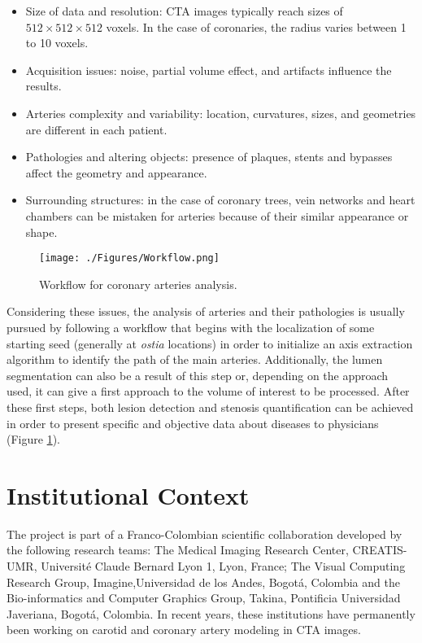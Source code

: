 \begin{itemize}
	\item Size of data and resolution: CTA images typically reach sizes of $512\times512\times512$ voxels. In the case of coronaries, the radius varies between 1 to 10 voxels.	
	\item Acquisition issues: noise, partial volume effect, and artifacts influence the results.	
	\item Arteries complexity and variability: location, curvatures, sizes, and geometries are different in each patient.
	\item Pathologies and altering objects: presence of plaques, stents and bypasses affect the geometry and appearance.
	\item Surrounding structures: in the case of coronary trees, vein networks and heart chambers can be mistaken for arteries because of their similar appearance or shape. 
\end{itemize}

\begin{figure}[htbp]
	\centering
		\texttt{[image: ./Figures/Workflow.png]}
	\caption[Workflow for coronary arteries analysis.]{Workflow for coronary arteries analysis.}
	\label{fig:Workflow}
\end{figure}

Considering these issues, the analysis of arteries and their pathologies is usually pursued by following a workflow that begins with the localization of some starting seed (generally at \textit{ostia} locations) in order to initialize an axis extraction algorithm to identify the path of the main arteries. Additionally, the lumen segmentation can also be a result of this step or, depending on the approach used, it can give a first approach to the volume of interest to be processed. After these first steps, both lesion detection and stenosis quantification can be achieved in order to present specific and objective data about diseases to physicians (Figure \ref{fig:Workflow}).

\section{Institutional Context}
%
The project is part of a Franco-Colombian scientific collaboration developed by the following research teams: The Medical Imaging Research Center, CREATIS-UMR, Universit\'{e} Claude Bernard Lyon 1, Lyon, France; The Visual Computing Research Group, Imagine,Universidad de los Andes, Bogot\'{a}, Colombia and the Bio-informatics and Computer Graphics Group, Takina, Pontificia Universidad Javeriana, Bogot\'{a}, Colombia. In recent years, these institutions have permanently been working on carotid and coronary artery modeling in CTA images.

